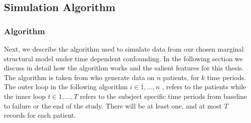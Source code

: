 \documentclass[11pt]{article}
\begin{document}
\subsection{Simulation Algorithm}\label{simulation-algorithm}

\subsubsection{Algorithm}\label{algorithm}

Next, we describe the algorithm used to simulate data from our chosen
marginal structural model under time dependent confounding. In the
following section we discuss in detail how the algorithm works and the
salient features for this thesis. The algorithm is taken from
\citet{Havercroft2012} who generate data on \(n\) patients, for \(k\)
time periods. The outer loop in the following algorithm
\(i \in {1, \dots, n}\) , refers to the patients while the inner loop
\(t \in {1, \dots, T}\) refers to the subsject specific time periods
from baseline to failure or the end of the study. There will be at least
one, and at most \(T\) records for each patient.
\end{document}
